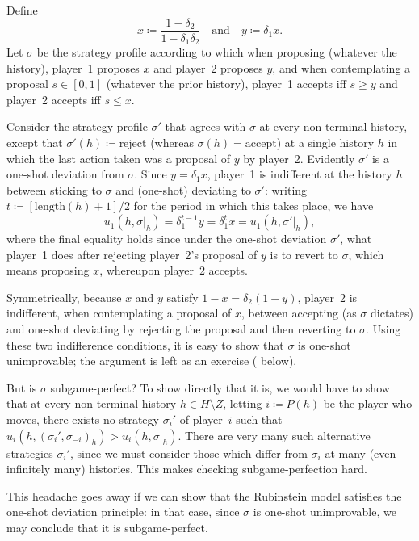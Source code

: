 \addtocounter{example}{-1}
\begin{example}[continued]
	\label{example:rubinstein_osd}
	Define
	\begin{equation*}
		x \coloneqq
		\frac{ 1 - \delta_2 }{ 1 - \delta_1 \delta_2 }
		\quad \text{and} \quad
		y \coloneqq \delta_1 x .
	\end{equation*}
	Let $\sigma$ be the strategy profile according to which when proposing (whatever the history), player~1 proposes $x$ and player~2 proposes $y$, and when contemplating a proposal $s \in [0,1]$ (whatever the prior history), player~1 accepts iff $s \geq y$ and player~2 accepts iff $s \leq x$.

	Consider the strategy profile $\sigma'$ that agrees with $\sigma$ at every non-terminal history, except that $\sigma'(h) \coloneqq \text{reject}$ (whereas $\sigma(h) = \text{accept}$) at a single history $h$ in which the last action taken was a proposal of $y$ by player~2. Evidently $\sigma'$ is a one-shot deviation from $\sigma$. Since $y = \delta_1 x$, player~1 is indifferent at the history $h$ between sticking to $\sigma$ and (one-shot) deviating to $\sigma'$: writing $t \coloneqq [\text{length}(h)+1]/2$ for the period in which this takes place, we have
	\begin{equation*}
		u_1(h,\sigma|_h)
		= \delta_1^{t-1} y
		= \delta_1^t x
		= u_1(h,\sigma'|_h) ,
	\end{equation*}
	where the final equality holds since under the one-shot deviation $\sigma'$, what player~1 does after rejecting player~2's proposal of $y$ is to revert to $\sigma$, which means proposing $x$, whereupon player~2 accepts.

	Symmetrically, because $x$ and $y$ satisfy $1-x = \delta_2 (1-y)$, player~2 is indifferent, when contemplating a proposal of $x$, between accepting (as $\sigma$ dictates) and one-shot deviating by rejecting the proposal and then reverting to $\sigma$. Using these two indifference conditions, it is easy to show that $\sigma$ is one-shot unimprovable; the argument is left as an exercise ( below).

	But is $\sigma$ subgame-perfect? To show directly that it is, we would have to show that at every non-terminal history $h \in H \setminus Z$, letting $i \coloneqq P(h)$ be the player who moves, there exists no strategy $\sigma_i'$ of player~$i$ such that $u_i(h,(\sigma_i',\sigma_{-i})_h) > u_i(h,\sigma|_h)$. There are very many such alternative strategies $\sigma_i'$, since we must consider those which differ from $\sigma_i$ at many (even infinitely many) histories. This makes checking subgame-perfection hard.

	This headache goes away if we can show that the Rubinstein model satisfies the one-shot deviation principle: in that case, since $\sigma$ is one-shot unimprovable, we may conclude that it is subgame-perfect.
\end{example}

